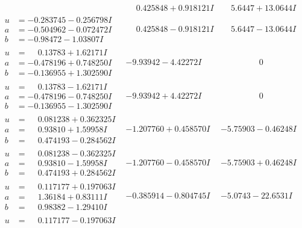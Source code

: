 \documentclass[1p]{elsarticle_modified}
\theoremstyle{definition}
\begin{document}
$$\begin{array}{c|c|c}
 & \phantom{-}0.425848 + 0.918121 I & \phantom{-}5.6447 + 13.0644 I \\ \hline\begin{aligned}
u &= -0.283745 - 0.256798 I \\
a &= -0.504962 - 0.072472 I \\
b &= -0.98472 - 1.03807 I\end{aligned}
 & \phantom{-}0.425848 - 0.918121 I & \phantom{-}5.6447 - 13.0644 I \\ \hline\begin{aligned}
u &= \phantom{-}0.13783 + 1.62171 I \\
a &= -0.478196 + 0.748250 I \\
b &= -0.136955 + 1.302590 I\end{aligned}
 & -9.93942 - 4.42272 I & \phantom{-0.000000 } 0 \\ \hline\begin{aligned}
u &= \phantom{-}0.13783 - 1.62171 I \\
a &= -0.478196 - 0.748250 I \\
b &= -0.136955 - 1.302590 I\end{aligned}
 & -9.93942 + 4.42272 I & \phantom{-0.000000 } 0 \\ \hline\begin{aligned}
u &= \phantom{-}0.081238 + 0.362325 I \\
a &= \phantom{-}0.93810 + 1.59958 I \\
b &= \phantom{-}0.474193 - 0.284562 I\end{aligned}
 & -1.207760 + 0.458570 I & -5.75903 - 0.46248 I \\ \hline\begin{aligned}
u &= \phantom{-}0.081238 - 0.362325 I \\
a &= \phantom{-}0.93810 - 1.59958 I \\
b &= \phantom{-}0.474193 + 0.284562 I\end{aligned}
 & -1.207760 - 0.458570 I & -5.75903 + 0.46248 I \\ \hline\begin{aligned}
u &= \phantom{-}0.117177 + 0.197063 I \\
a &= \phantom{-}1.36184 + 0.83111 I \\
b &= \phantom{-}0.98382 - 1.29410 I\end{aligned}
 & -0.385914 - 0.804745 I & -5.0743 - 22.6531 I \\ \hline\begin{aligned}
u &= \phantom{-}0.117177 - 0.197063 I \\

\end{aligned}
\end{array}$$
\end{document}
